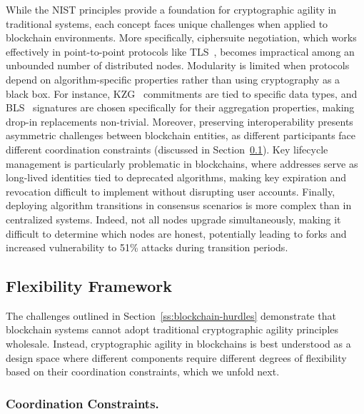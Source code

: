 While the NIST principles provide a foundation for cryptographic agility in traditional systems, each concept faces unique challenges when applied to blockchain environments. 
More specifically, ciphersuite negotiation, which works effectively in point-to-point protocols like TLS~\cite{rfc8446_tls13}, becomes impractical among an unbounded number of distributed nodes. 
Modularity is limited when protocols depend on algorithm-specific properties rather than using cryptography as a black box. 
For instance, KZG~\cite{ASIACRYPT:10KZG} commitments are tied to specific data types, and BLS~\cite{ASIACRYPT:01BLS} signatures are chosen specifically for their aggregation properties, making drop-in replacements non-trivial.
Moreover, preserving interoperability presents asymmetric challenges between blockchain entities, as different participants face different coordination constraints (discussed in Section~\ref{ss:flexibility-spectrum}).
Key lifecycle management is particularly problematic in blockchains, where addresses serve as long-lived identities tied to deprecated algorithms, making key expiration and revocation difficult to implement without disrupting user accounts. 
Finally, deploying algorithm transitions in consensus scenarios is more complex than in centralized systems.
Indeed, not all nodes upgrade simultaneously, making it difficult to determine which nodes are honest, potentially leading to forks and increased vulnerability to 51\% attacks during transition periods. 


\subsection{Flexibility Framework}\label{ss:flexibility-spectrum}

The challenges outlined in Section~\ref{ss:blockchain-hurdles} demonstrate that blockchain systems cannot adopt traditional cryptographic agility principles wholesale.
Instead, cryptographic agility in blockchains is best understood as a design space where different components require different degrees of flexibility based on their coordination constraints, which we unfold next.

\subsubsection{Coordination Constraints.}\label{subsubsec:coordination-constraints}

